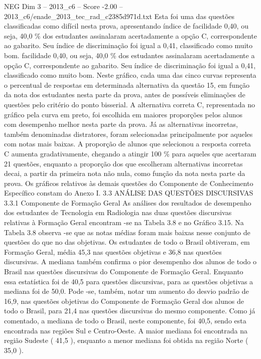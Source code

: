 \begin{textsample}{NEG Dim 3 – 2013\_c6 – Score -2.00 – 2013\_c6/enade\_2013\_tec\_rad\_c2385d971d.txt}
Esta foi uma das questões classificadas como difícil nesta prova, apresentando índice de facilidade 0,40, ou seja, 40,0 \% dos estudantes assinalaram acertadamente a opção C, correspondente ao gabarito.
Seu índice de discriminação foi igual a 0,41, classificado como muito bom. facilidade 0,40, ou seja, 40,0 \% dos estudantes assinalaram acertadamente a opção C, correspondente ao gabarito.
Seu índice de discriminação foi igual a 0,41, classificado como muito bom.
Neste gráfico, cada uma das cinco curvas representa o percentual de respostas em determinada alternativa da questão 15, em função da nota dos estudantes nesta parte da prova, antes de possíveis eliminações de questões pelo critério do ponto bisserial.
A alternativa correta C, representada no gráfico pela curva em preto, foi escolhida em maiores proporções pelos alunos com desempenho melhor nesta parte da prova.
Já as alternativas incorretas, também denominadas distratores, foram selecionadas principalmente por aqueles com notas mais baixas.
A proporção de alunos que selecionou a resposta correta C aumenta gradativamente, chegando a atingir 100 \% para aqueles que acertaram 21 questões, enquanto a proporção dos que escolheram alternativas incorretas decai, a partir da primeira nota não nula, como função da nota nesta parte da prova.
Os gráficos relativos às demais questões do Componente de Conhecimento Específico constam do Anexo I. 3.3 ANÁLISE DAS QUESTÕES DISCURSIVAS 3.3.1 Componente de Formação Geral As análises dos resultados de desempenho dos estudantes de Tecnologia em Radiologia nas duas questões discursivas relativas à Formação Geral encontram -se na Tabela 3.8 e no Gráfico 3.15.
Na Tabela 3.8 observa -se que as notas médias foram mais baixas nesse conjunto de questões do que no das objetivas.
Os estudantes de todo o Brasil obtiveram, em Formação Geral, média 45,3 nas questões objetivas e 36,8 nas questões discursivas.
A mediana também confirma o pior desempenho dos alunos de todo o Brasil nas questões discursivas do Componente de Formação Geral.
Enquanto essa estatística foi de 40,5 para questões discursivas, para as questões objetivas a mediana foi de 50,0.
Pode -se, também, notar um aumento do desvio padrão de 16,9, nas questões objetivas do Componente de Formação Geral dos alunos de todo o Brasil, para 21,4 nas questões discursivas do mesmo componente.
Como já comentado, a mediana de todo o Brasil, neste componente, foi 40,5, sendo esta encontrada nas regiões Sul e Centro-Oeste.
A maior mediana foi encontrada na região Sudeste ( 41,5 ), enquanto a menor mediana foi obtida na região Norte ( 35,0 ).

\end{textsample}
